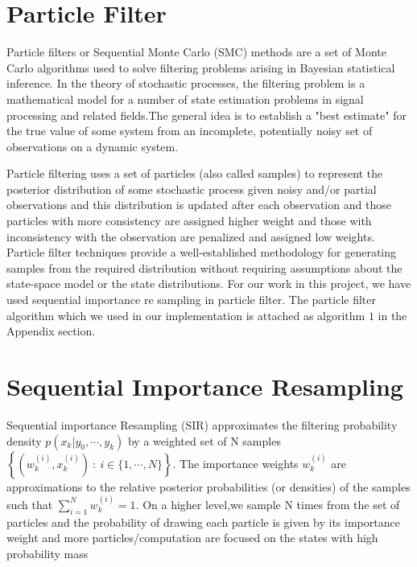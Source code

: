 \documentclass[12pt,letterpaper]{article}
\begin{document}
\section{Particle Filter}
Particle filters or Sequential Monte Carlo (SMC) methods are a set of Monte Carlo algorithms used to solve filtering problems arising in Bayesian statistical inference. In the theory of stochastic processes, the filtering problem is a mathematical model for a number of state estimation problems in signal processing and related fields.The general idea is to establish a "best estimate" for the true value of some system from an incomplete, potentially noisy set of observations on a dynamic system. 

Particle filtering uses a set of particles (also called samples) to represent the posterior distribution of some stochastic process given noisy and/or partial observations and this distribution is updated after each observation and those particles with more consistency are assigned higher weight and those with inconsistency with the observation are penalized and assigned low weights. Particle filter techniques provide a well-established methodology for generating samples from the required distribution without requiring assumptions about the state-space model or the state distributions. For our work in this project, we have used sequential importance re sampling in particle filter. The particle filter algorithm which we used in our implementation is attached as algorithm $1$ in the Appendix section.

\section{Sequential Importance Resampling}
Sequential importance Resampling (SIR) approximates the filtering probability density ${p(x_{k}|y_{0},\cdots ,y_{k})}$ by a weighted set of N samples ${\displaystyle \left\{\left(w_{k}^{(i)},x_{k}^{(i)}\right)\ :\ i\in \{1,\cdots ,N\}\right\}.}$ The importance weights ${\displaystyle w_{k}^{(i)}}$ are approximations to the relative posterior probabilities (or densities) of the samples such that
${\sum _{i=1}^{N}w_{k}^{(i)}=1.}$ On a higher level,we sample N times from the set of particles and the probability of drawing each particle is given by its importance weight and more particles/computation are focused on the states
with high probability mass
\end{document}
